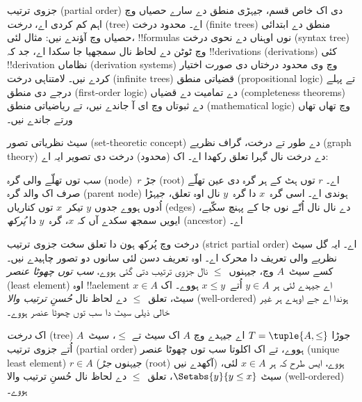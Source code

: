 \documentclass[../../../include/open-logic-section]{subfiles}
\begin{document}

جزوی ترتیب (partial order) دی اک خاص قسم، جیہڑی منطق دے سارے حصیاں وچ
اہم کم کردی اے، \emph{درخت} (tree) اے۔ محدود درخت (finite trees) منطق
دے ابتدائی حصیاں وچ آؤندے نیں: مثال لئی، !!{formula}s نوں اوہناں دے
نحوی درخت (syntax tree) وچ ٹوٹن دے لحاظ نال سمجھیا جا سکدا اے، جد کہ
!!{derivation}s (derivations) کئی !!{derivation} نظاماں (derivation
systems) وچ وی محدود درختاں دی صورت اختیار کردے نیں۔
%
لامتناہی درخت (infinite trees) قضیاتی منطق (propositional logic) تے پہلے
درجے دی منطق (first-order logic) دے تمامیت دے قضیاں (completeness
theorems) دے ثبوتاں وچ ای آ جاندے نیں، تے ریاضیاتی منطق (mathematical
logic) وچ تھاں تھاں ورتے جاندے نیں۔

سیٹ نظریاتی تصور (set-theoretic concept) دے طور تے درخت، گراف نظریے
(graph theory) دے درخت نال گہرا تعلق رکھدا اے۔ اک (محدود) درخت دی
تصویر ایہ اے:

\begin{center}
\end{center}

سب توں تھلّے والی گرہ (node)~$r$ جڑ (root) اے۔ $r$ توں ہٹ کے ہر گرہ
دی عین تھلّے صرف اک والد گرہ (parent node) ہوندی اے۔ اسی گرہ~$x$ دا
گرہ~$y$ نال اوہ تعلق، جیہڑا اُدوں ہووے جدوں $y$ تیکر~$x$ توں کناریاں
(edges) دے نال نال اُتّے نوں جا کے پہنچ سکّیے، ایویں سمجھ سکدے آں کہ
$x$، گرہ~$y$ دا \emph{پُرکھ} (ancestor) اے۔

درخت وچ پُرکھ ہون دا تعلق سخت جزوی ترتیب (strict partial order) اے۔ ایہ
گل سیٹ نظریے والی تعریف دا محرک اے۔ اوہ تعریف دسن لئی سانوں دو تصور
چاہیدے نیں۔ کسے سیٹ~$A$ وچ، جیہنوں~$\le$ نال جزوی ترتیب دتی گئی ہووے،
\emph{سب توں چھوٹا عنصر} (least element) اوہ !!a{element} $x \in A$
اے جیہدے لئی ہر $y \in A$ اُتے~$x \le y$ ہووے۔ اک سیٹ، تعلق~$\le$ دے
لحاظ نال \emph{حُسنِ ترتیب والا} (well-ordered) ہوندا اے جے اوہدے ہر
غیر خالی ذیلی سیٹ دا سب توں چھوٹا عنصر ہووے۔

\begin{defn}
اک \emph{درخت} (tree) جوڑا $T = \tuple{A, \le}$ اے جیہدے وچ $A$ اک
سیٹ تے $\le$، سیٹ~$A$ اُتے جزوی ترتیب (partial order) ہووے، تے اک
اکلوتا سب توں چھوٹا عنصر (unique least element) $r \in A$ (جیہنوں
\emph{جڑ} (root) آکھدے نیں) ہووے، ایس طرح کہ ہر $x \in A$ لئی، سیٹ
$\Setabs{y}{y \le x}$، تعلق~$\le$ دے لحاظ نال حُسنِ ترتیب والا
(well-ordered) ہووے۔
\end{defn}
\end{document}

